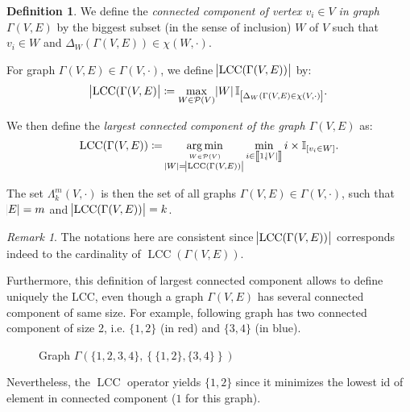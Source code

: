 \documentclass{article}
\theoremstyle{definition}
\newtheorem{definition}[lemma]{Definition}
\theoremstyle{remark}
\newtheorem*{remark}{Remark}
\DeclareMathOperator{\LCC}{LCC}
\DeclareMathOperator*{\argmin}{arg\,min}
\newcommand{\intint}[2]{\left\llbracket#1, #2\right\rrbracket}
\begin{document}
		\begin{definition} We define the \textit{connected component of vertex $v_i \in V$ in graph $\Gamma(V, E)$} by the biggest subset (in the sense of inclusion) $W$
		of $V$ such that $v_i \in W$ and $\Delta_W(\Gamma(V, E)) \in \chi(W, \cdot)$.

		For graph $\Gamma(V, E) \in \Gamma(V, \cdot)$, we define $\abs {\LCC(\Gamma(V, E))}$ by:
		\[\abs {\LCC(\Gamma(V, E)} \coloneqq \max_{W \in \mathcal P(V)}\abs W\mathbb I_{\left[\Delta_W(\Gamma(V, E) \in \chi(V, \cdot)\right]}.\]

		We then define the \textit{largest connected component of the graph $\Gamma(V, E)$} as:
		\[\LCC(\Gamma(V, E)) \coloneqq \argmin_{\stackrel {W \in \mathcal P(V)}{\abs W =
			\abs {\LCC(\Gamma(V, E))}}}\min_{i \in \intint 1{\abs V}}i \times \mathbb I_{[v_i \in W]}.\]

		The set $\Lambda_k^m(V, \cdot)$ is then the set of all graphs $\Gamma(V, E) \in \Gamma(V, \cdot)$, such that $\abs E = m$ and $\abs {\LCC(\Gamma(V, E))} = k$.
		\end{definition}

		\begin{remark} The notations here are consistent since $\abs {\LCC(\Gamma(V, E))}$ corresponds indeed to the cardinality of $\LCC(\Gamma(V, E))$.

		Furthermore, this definition of largest connected component allows to define uniquely the LCC, even though a graph $\Gamma(V, E)$ has several connected component
		of same size. For example, following graph has two connected component of size 2, i.e. $\{1, 2\}$ (in red) and $\{3, 4\}$ (in blue).

		\begin{figure}[H]
		\begin{center}
		\end{center}
		\caption{Graph $\Gamma\left(\{1, 2, 3, 4\}, \left\{\{1, 2\}, \{3, 4\}\right\}\right)$}
		\end{figure}

		Nevertheless, the $\LCC$ operator yields $\{1, 2\}$ since it minimizes the lowest id of element in connected component ($1$ for this graph).
		\end{remark}
\end{document}
